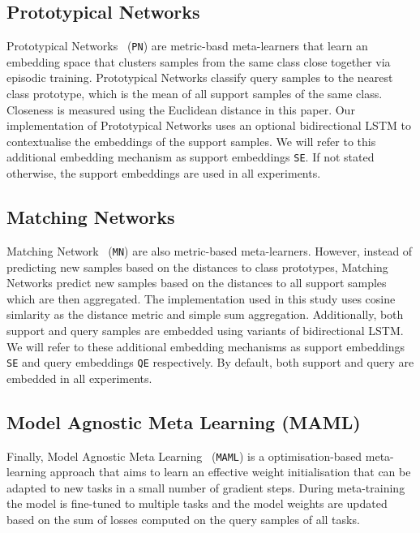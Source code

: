 \subsection{Prototypical Networks}

Prototypical Networks~\cite{protonet} (\texttt{PN}) are metric-basd meta-learners that learn an embedding space that clusters samples from the same class close together via episodic training. Prototypical Networks classify query samples to the nearest class prototype, which is the mean of all support samples of the same class. Closeness is measured using the Euclidean distance in this paper. Our implementation of Prototypical Networks uses an optional bidirectional LSTM to contextualise the embeddings of the support samples. We will refer to this additional embedding mechanism as support embeddings \texttt{SE}. If not stated otherwise, the support embeddings are used in all experiments.

\subsection{Matching Networks}

Matching Network~\cite{matchingnet} (\texttt{MN}) are also metric-based meta-learners. However, instead of predicting new samples based on the distances to class prototypes, Matching Networks predict new samples based on the distances to all support samples which are then aggregated. The implementation used in this study uses cosine simlarity as the distance metric and simple sum aggregation. Additionally, both support and query samples are embedded using variants of bidirectional LSTM. We will refer to these additional embedding mechanisms as support embeddings \texttt{SE} and query embeddings \texttt{QE} respectively. By default, both support and query are embedded in all experiments.

\subsection{Model Agnostic Meta Learning (MAML)}

Finally, Model Agnostic Meta Learning~\cite{maml} (\texttt{MAML}) is a optimisation-based meta-learning approach that aims to learn an effective weight initialisation that can be adapted to new tasks in a small number of gradient steps. During meta-training the model is fine-tuned to multiple tasks and the model weights are updated based on the sum of losses computed on the query samples of all tasks.

